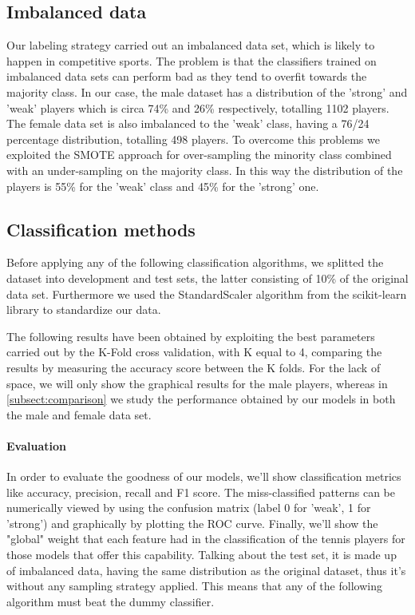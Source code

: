 \subsection{Imbalanced data}
Our labeling strategy carried out an imbalanced data set, which is likely to happen in competitive sports. The problem is that the classifiers trained on imbalanced data sets can perform bad as they tend to overfit towards the majority class. In our case, the male dataset has a distribution of the 'strong' and 'weak' players which is circa 74\% and 26\% respectively, totalling 1102 players. The female data set is also imbalanced to the 'weak' class, having a 76/24 percentage distribution, totalling 498 players. To overcome this problems we exploited the SMOTE approach for over-sampling the minority class combined with an under-sampling on the majority class. In this way the distribution of the players is 55\% for the 'weak' class and 45\% for the 'strong' one.

\subsection{Classification methods}
Before applying any of the following classification algorithms, we splitted the dataset into development and test sets, the latter consisting of 10\% of the original data set. Furthermore we used the StandardScaler algorithm from the scikit-learn library to standardize our data.

The following results have been obtained by exploiting the best parameters carried out by the K-Fold cross validation, with K equal to 4, comparing the results by measuring the accuracy score between the K folds. For the lack of space, we will only show the graphical results for the male players, whereas in \autoref{subsect:comparison} we study the performance obtained by our models in both the male and female data set.

\paragraph{Evaluation} In order to evaluate the goodness of our models, we'll show classification metrics like accuracy, precision, recall and F1 score. The miss-classified patterns can be numerically viewed by using the confusion matrix (label 0 for 'weak', 1 for 'strong') and graphically by plotting the ROC curve. Finally, we'll show the "global" weight that each feature had in the classification of the tennis players for those models that offer this capability. Talking about the test set, it is made up of imbalanced data, having the same distribution as the original dataset, thus it's without any sampling strategy applied. This means that any of the following algorithm must beat the dummy classifier.


